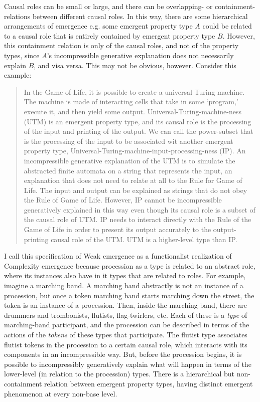 \documentclass{article}
\newcommand{\ti}[1]{\textit{#1}}
\begin{document}
Causal roles can be small or large, and there can be overlapping- or containment-relations between different causal roles. In this way, there are some hierarchical arrangements of emergence e.g. some emergent property type $A$ could be related to a causal role that is entirely contained by emergent property type $B$. However, this containment relation is only of the causal roles, and not of the property types, since $A$'s incompressible generative explanation does not necessarily explain $B$, and visa versa. This may not be obvious, however. Consider this example:

\begin{quote}
In the Game of Life, it is possible to create a universal Turing machine. The machine is made of interacting cells that take in some `program,' execute it, and then yield some output. Universal-Turing-machine-ness (UTM) is an emergent property type, and its causal role is the processing of the input and printing of the output. We can call the power-subset that is the processing of the input to be associated wit another emergent property type, Universal-Turing-machine-input-processing-ness (IP). An incompressible generative explanation of the UTM is to simulate the abstracted finite automata on a string that represents the input, an explanation that does not need to relate at all to the Rule for Game of Life. The input and output can be explained as strings that do not obey the Rule of Game of Life. However, IP cannot be incompressible generatively explained in this way even though its causal role is a subset of the causal role of UTM. IP needs to interact directly with the Rule of the Game of Life in order to present its output accurately to the output-printing causal role of the UTM. UTM is a higher-level type than IP.
\end{quote}

I call this specification of Weak emergence as a functionalist realization of Complexity emergence because procession as a type is related to an abstract role, where its instances also have in it types that are related to roles. For example, imagine a marching band. A marching band abstractly is not an instance of a procession, but once a token marching band starts marching down the street, the token is an instance of a procession. Then, inside the marching band, there are drummers and trombonists, flutists, flag-twirlers, etc. Each of these is a \ti{type} of marching-band participant, and the procession can be described in terms of the actions of the \ti{tokens} of these types that participate. The flutist type associates flutist tokens in the procession to a certain causal role, which interacts with its components in an incompressible way. But, before the procession begins, it is possible to incompressibly generatively explain what will happen in terms of the lower-level (in relation to the procession) types. There is a hierarchical but non-containment relation between emergent property types, having distinct emergent phenomenon at every non-base level.
\end{document}
